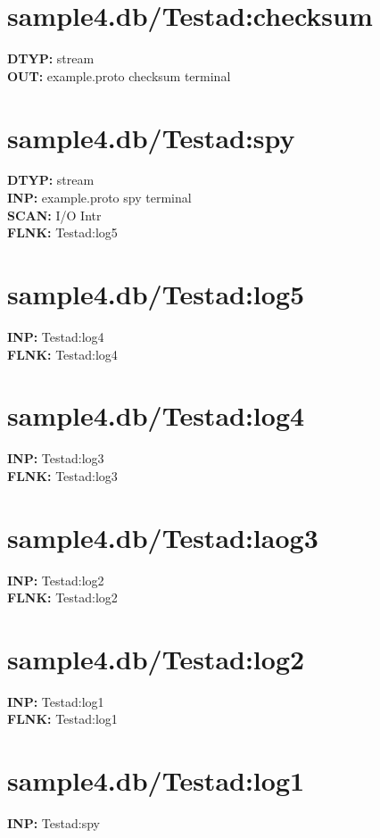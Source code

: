 \documentclass[12pt]{article}
\begin{document}
\section{sample4.db/Test\textunderscore ad:checksum}
\textbf{DTYP: }stream \\
\textbf{OUT: }example.proto checksum terminal \\
\newpage
\section{sample4.db/Test\textunderscore ad:spy}
\textbf{DTYP: }stream \\
\textbf{INP: }example.proto spy terminal \\
\textbf{SCAN: }I\slash O Intr \\
\textbf{FLNK: }Test\textunderscore ad:log5 \\
\newpage
\section{sample4.db/Test\textunderscore ad:log5}
\textbf{INP: }Test\textunderscore ad:log4 \\
\textbf{FLNK: }Test\textunderscore ad:log4 \\
\newpage
\section{sample4.db/Test\textunderscore ad:log4}
\textbf{INP: }Test\textunderscore ad:log3 \\
\textbf{FLNK: }Test\textunderscore ad:log3 \\
\newpage
\section{sample4.db/Test\textunderscore ad:laog3}
\textbf{INP: }Test\textunderscore ad:log2 \\
\textbf{FLNK: }Test\textunderscore ad:log2 \\
\newpage
\section{sample4.db/Test\textunderscore ad:log2}
\textbf{INP: }Test\textunderscore ad:log1 \\
\textbf{FLNK: }Test\textunderscore ad:log1 \\
\newpage
\section{sample4.db/Test\textunderscore ad:log1}
\textbf{INP: }Test\textunderscore ad:spy \\
\newpage
\end{document}
